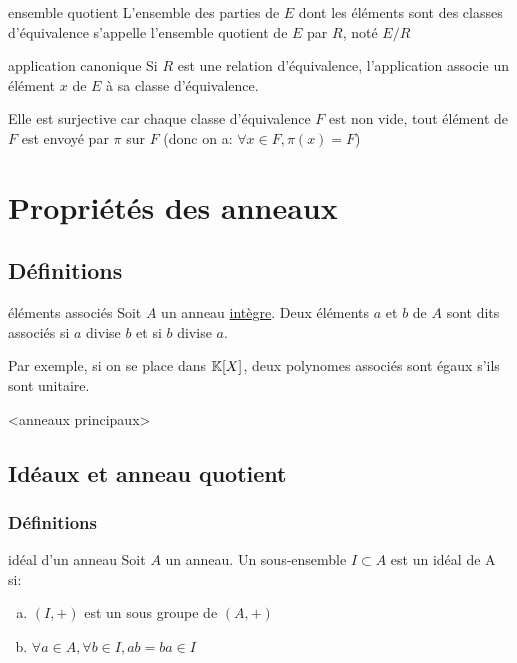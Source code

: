 \begin{definition}{ensemble quotient}{}
    L'ensemble des parties de $E$ dont les éléments sont des classes d'équivalence s'appelle l'ensemble quotient de $E$ par $R$,
    noté $E/R$
\end{definition}

\begin{proposition}{application canonique}{}
    Si $R$ est une relation d'équivalence, l'application 
    associe un élément $x$ de $E$ à sa classe d'équivalence.

    Elle est surjective car chaque classe d'équivalence $F$ est non vide, tout élément de $F$ est envoyé par
    $\pi$ sur $F$ (donc on a: $\forall x \in F, \pi(x) = F$)
\end{proposition}








\section{Propriétés des anneaux}

\subsection{Définitions}

\begin{definition}{éléments associés}{}
    Soit $A$ un anneau \underline{intègre}.
    Deux éléments $a$ et $b$ de $A$ sont dits associés si $a$ divise $b$ et si $b$ divise $a$.
\end{definition}

Par exemple, si on se place dans $\mathbb{K}[X]$, deux polynomes associés sont égaux s'ils sont unitaire.

<anneaux principaux>


\subsection{Idéaux et anneau quotient}

\subsubsection{Définitions}

\begin{definition}{idéal d'un anneau}{}
    Soit $A$ un anneau. Un sous-ensemble $I \subset A$ est un idéal de A si:
    \begin{enumerate}[(a)]
        \item $(I, +)$ est un sous groupe de $(A, +)$
        \item $\forall a \in A, \forall b \in I, ab = ba \in I$
    \end{enumerate}
\end{definition}

